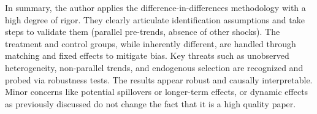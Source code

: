 In summary, the author applies the difference-in-differences methodology with a high degree of rigor. They clearly articulate identification assumptions and take steps to validate them (parallel pre-trends, absence of other shocks). The treatment and control groups, while inherently different, are handled through matching and fixed effects to mitigate bias. Key threats such as unobserved heterogeneity, non-parallel trends, and endogenous selection are recognized and probed via robustness tests. The results appear robust and causally interpretable. Minor concerns like potential spillovers or longer-term effects, or dynamic effects as previously discussed do not change the fact that it is a high quality paper.